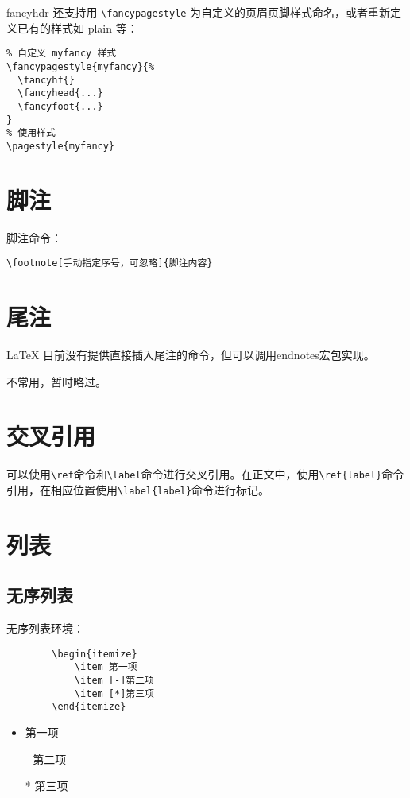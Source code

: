 {fancyhdr} 还支持用 \lstinline{\fancypagestyle} 为自定义的页眉页脚样式命名，或者重新定义已有的样式如 {plain} 等：
\begin{lstlisting}
% 自定义 myfancy 样式
\fancypagestyle{myfancy}{%
  \fancyhf{}
  \fancyhead{...}
  \fancyfoot{...}
}
% 使用样式
\pagestyle{myfancy}
\end{lstlisting}


\section{脚注}\label{sec:footnote}

脚注命令：
\begin{lstlisting}
\footnote[手动指定序号，可忽略]{脚注内容}
\end{lstlisting}



\section{尾注}\label{sec:endnote}
\LaTeX{} 目前没有提供直接插入尾注的命令，但可以调用endnotes宏包实现。

不常用，暂时略过。

\section{交叉引用}\label{sec:crossref}
可以使用\lstinline|\ref|命令和\lstinline|\label|命令进行交叉引用。在正文中，使用\lstinline|\ref{label}|命令引用，在相应位置使用\lstinline|\label{label}|命令进行标记。

\section{列表}\label{sec:list}

\subsection{无序列表}\label{subsec:itemize}
无序列表环境：

\vspace{2em}
\begin{minipage}{0.45\textwidth}
    \begin{lstlisting}
        \begin{itemize}
            \item 第一项
            \item [-]第二项
            \item [*]第三项
        \end{itemize}
    \end{lstlisting}
\end{minipage}
\begin{minipage}{0.45\textwidth}
    \begin{itemize}
        \item 第一项
        \item [-]第二项
        \item [*]第三项
    \end{itemize}
\end{minipage}

